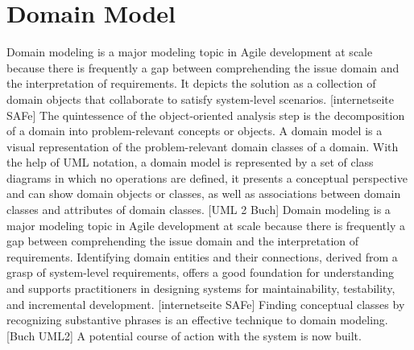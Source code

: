 \section{Domain Model}
Domain modeling is a major modeling topic in Agile development at scale because there is frequently a gap between comprehending the issue domain and the interpretation of requirements. It depicts the solution as a collection of domain objects that collaborate to satisfy system-level scenarios. [internetseite SAFe] The quintessence of the object-oriented analysis step is the decomposition of a domain into problem-relevant concepts or objects. A domain model is a visual representation of the problem-relevant domain classes of a domain. With the help of UML notation, a domain model is represented by a set of class diagrams in which no operations are defined, it presents a conceptual perspective and can show domain objects or classes, as well as associations between domain classes and attributes of domain classes. [UML 2 Buch]  Domain modeling is a major modeling topic in Agile development at scale because there is frequently a gap between comprehending the issue domain and the interpretation of requirements. Identifying domain entities and their connections, derived from a grasp of system-level requirements, offers a good foundation for understanding and supports practitioners in designing systems for maintainability, testability, and incremental development. [internetseite SAFe] Finding conceptual classes by recognizing substantive phrases is an effective technique to domain modeling. [Buch UML2] A potential course of action with the system is now built.

